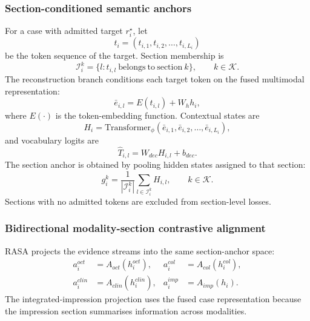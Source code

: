 \subsubsection{Section-conditioned semantic anchors}
\label{subsubsec:section_decoder_final_topcs}

For a case with admitted target $r_i^{\star}$, let
\begin{equation}
t_i=(t_{i,1},t_{i,2},\ldots,t_{i,L_i})
\label{eq:mosaic_token_sequence_final_topcs}
\end{equation}
be the token sequence of the target. Section membership is
\begin{equation}
\mathcal{I}_i^k=\{l:t_{i,l}\ \mathrm{belongs\ to\ section}\ k\},
\qquad k\in\mathcal{K}.
\label{eq:mosaic_section_token_index_final_topcs}
\end{equation}
The reconstruction branch conditions each target token on the fused multimodal representation:
\begin{equation}
\bar e_{i,l}=E(t_{i,l})+W_hh_i,
\label{eq:mosaic_conditioned_embedding_final_topcs}
\end{equation}
where $E(\cdot)$ is the token-embedding function. Contextual states are
\begin{equation}
H_i=
\mathrm{Transformer}_{\phi}(\bar e_{i,1},\bar e_{i,2},\ldots,\bar e_{i,L_i}),
\label{eq:mosaic_semantic_states_final_topcs}
\end{equation}
and vocabulary logits are
\begin{equation}
\hat T_{i,l}=W_{dec}H_{i,l}+b_{dec}.
\label{eq:mosaic_token_logits_final_topcs}
\end{equation}
The section anchor is obtained by pooling hidden states assigned to that section:
\begin{equation}
g_i^k=
\frac{1}{|\mathcal{I}_i^k|}
\sum_{l\in\mathcal{I}_i^k}H_{i,l},
\qquad
k\in\mathcal{K}.
\label{eq:mosaic_section_anchor_final_topcs}
\end{equation}
Sections with no admitted tokens are excluded from section-level losses.

\subsubsection{Bidirectional modality-section contrastive alignment}
\label{subsubsec:evidence_section_alignment_final_topcs}

RASA projects the evidence streams into the same section-anchor space:
\begin{equation}
\begin{aligned}
a_i^{oct}&=A_{oct}(h_i^{oct}),&
a_i^{col}&=A_{col}(h_i^{col}),\\
a_i^{clin}&=A_{clin}(h_i^{clin}),&
a_i^{imp}&=A_{imp}(h_i).
\end{aligned}
\label{eq:mosaic_section_projection_final_topcs}
\end{equation}
The integrated-impression projection uses the fused case representation because the impression section summarises information across modalities.

